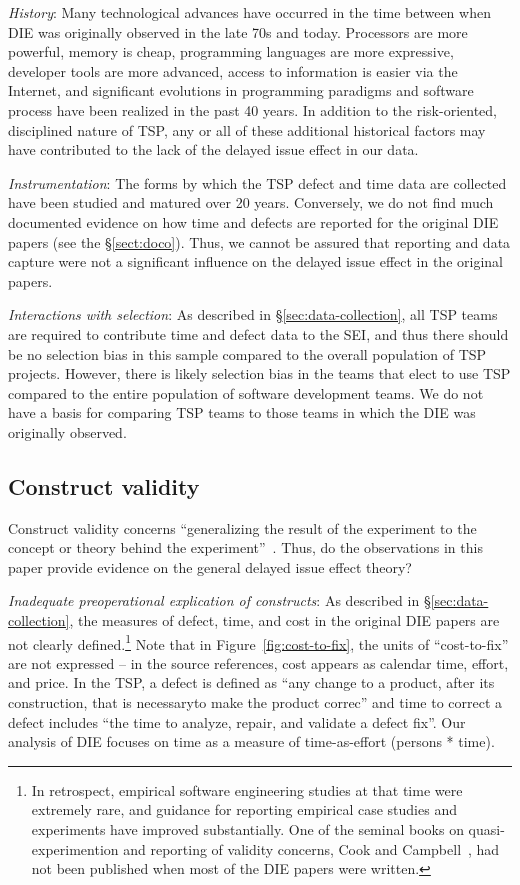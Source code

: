 \documentclass[smallcondensed]{svjour3}
\begin{document}
\textit{History}: Many technological advances have occurred in the time between when DIE was originally observed in the late 70s and today. Processors are more powerful, memory is cheap, programming languages are more expressive, developer tools are more advanced, access to information is easier via the Internet, and significant evolutions in programming paradigms and software process have been realized in the past 40 years. In addition to the risk-oriented, disciplined nature of TSP, any or all of these additional historical factors may have contributed to the lack of the delayed issue effect in our data. 

\textit{Instrumentation}: The forms by which the TSP defect and time data are collected have been studied and matured over 20 years. Conversely, we do not find much documented evidence on how time and defects are reported for the original DIE papers (see the \S\ref{sect:doco}). Thus, we cannot be assured that reporting and data capture were not a significant influence on the delayed issue effect in the original papers.

\textit{Interactions with selection}: As described in \S\ref{sec:data-collection}, all TSP teams are required to contribute time and defect data to the SEI, and thus there should be no selection bias in this sample compared to the overall population of TSP projects. However, there is likely selection bias in the teams that elect to use TSP compared to the entire population of software development teams. We do not have a basis for comparing TSP teams to those teams in which the DIE was originally observed.


\subsection{Construct validity} 
Construct validity concerns ``generalizing the result of the experiment to the concept or theory behind the experiment''~\cite{wohlin2012}. Thus, do the observations in this paper provide evidence on the general delayed issue effect theory?

\textit{Inadequate preoperational explication of constructs}: As described in \S\ref{sec:data-collection}, the measures of defect, time, and cost in the original DIE papers are not clearly defined.\footnote{In retrospect, empirical software engineering studies at that time were extremely rare, and guidance for reporting empirical case studies and experiments have improved substantially. One of the seminal books on quasi-experimention and reporting of validity concerns, Cook and Campbell~\cite{cook1979}, had not been published when most of the DIE papers were written.} Note that in Figure~\ref{fig:cost-to-fix}, the units of ``cost-to-fix'' are not expressed -- in the source references, cost appears as calendar time, effort, and price. In the TSP, a defect is defined as ``any change to a product, after its construction, that is necessaryto make the product correc'' and time to correct a defect includes ``the time to analyze, repair, and validate a defect fix''. Our analysis of DIE focuses on time as a measure of time-as-effort (persons * time). 
\end{document}
